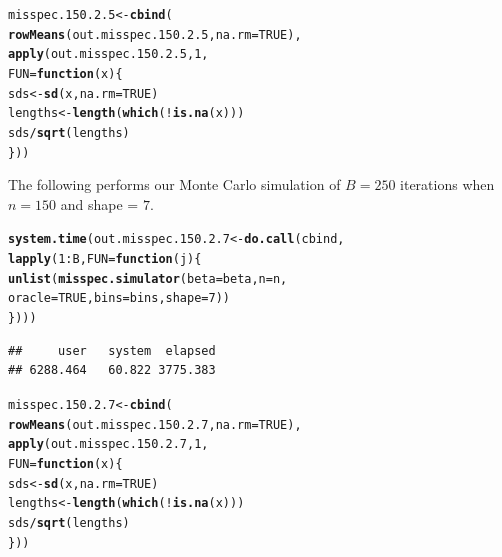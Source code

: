 \documentclass[11pt]{article}\usepackage[]{graphicx}\usepackage[]{color}
\makeatletter
\newcommand{\hlnum}[1]{\textcolor[rgb]{0.686,0.059,0.569}{#1}}%
\newcommand{\hlopt}[1]{\textcolor[rgb]{0,0,0}{#1}}%
\newcommand{\hlstd}[1]{\textcolor[rgb]{0.345,0.345,0.345}{#1}}%
\newcommand{\hlkwa}[1]{\textcolor[rgb]{0.161,0.373,0.58}{\textbf{#1}}}%
\newcommand{\hlkwb}[1]{\textcolor[rgb]{0.69,0.353,0.396}{#1}}%
\newcommand{\hlkwc}[1]{\textcolor[rgb]{0.333,0.667,0.333}{#1}}%
\newcommand{\hlkwd}[1]{\textcolor[rgb]{0.737,0.353,0.396}{\textbf{#1}}}%
\newenvironment{kframe}{%
 \def\at@end@of@kframe{}%
 \ifinner\ifhmode%
  \def\at@end@of@kframe{\end{minipage}}%
  \begin{minipage}{\columnwidth}%
 \fi\fi%
 \def\FrameCommand##1{\hskip\@totalleftmargin \hskip-\fboxsep
 \colorbox{shadecolor}{##1}\hskip-\fboxsep
     \hskip-\linewidth \hskip-\@totalleftmargin \hskip\columnwidth}%
 \MakeFramed {\advance\hsize-\width
   \@totalleftmargin\z@ \linewidth\hsize
   \@setminipage}}%
 {\par\unskip\endMakeFramed%
 \at@end@of@kframe}
\newenvironment{knitrout}{}{} %
\makeatother
\begin{document}
\begin{knitrout}
\color{fgcolor}\begin{kframe}
\begin{alltt}
\hlstd{misspec.150.2.5} \hlkwb{<-} \hlkwd{cbind}\hlstd{(}
  \hlkwd{rowMeans}\hlstd{(out.misspec.150.2.5,} \hlkwc{na.rm} \hlstd{=} \hlnum{TRUE}\hlstd{),}
  \hlkwd{apply}\hlstd{(out.misspec.150.2.5,} \hlnum{1}\hlstd{,}
  \hlkwc{FUN} \hlstd{=} \hlkwa{function}\hlstd{(}\hlkwc{x}\hlstd{)\{}
    \hlstd{sds} \hlkwb{<-} \hlkwd{sd}\hlstd{(x,} \hlkwc{na.rm} \hlstd{=} \hlnum{TRUE}\hlstd{)}
    \hlstd{lengths} \hlkwb{<-} \hlkwd{length}\hlstd{(}\hlkwd{which}\hlstd{(}\hlopt{!}\hlkwd{is.na}\hlstd{(x)))}
    \hlstd{sds} \hlopt{/} \hlkwd{sqrt}\hlstd{(lengths)}
  \hlstd{\}))}
\end{alltt}
\end{kframe}
\end{knitrout}

The following performs our Monte Carlo simulation of $B = 250$ iterations 
when $n = 150$ and shape = $7$.

\begin{knitrout}
\color{fgcolor}\begin{kframe}
\begin{alltt}
\hlkwd{system.time}\hlstd{(out.misspec.150.2.7} \hlkwb{<-} \hlkwd{do.call}\hlstd{(cbind,}
  \hlkwd{lapply}\hlstd{(}\hlnum{1}\hlopt{:}\hlstd{B,} \hlkwc{FUN} \hlstd{=} \hlkwa{function}\hlstd{(}\hlkwc{j}\hlstd{)\{}
    \hlkwd{unlist}\hlstd{(}\hlkwd{misspec.simulator}\hlstd{(}\hlkwc{beta} \hlstd{= beta,} \hlkwc{n} \hlstd{= n,}
      \hlkwc{oracle} \hlstd{=} \hlnum{TRUE}\hlstd{,} \hlkwc{bins} \hlstd{= bins,} \hlkwc{shape} \hlstd{=} \hlnum{7}\hlstd{))}
\hlstd{\})))}
\end{alltt}
\begin{verbatim}
##     user   system  elapsed 
## 6288.464   60.822 3775.383
\end{verbatim}
\end{kframe}
\end{knitrout}

\begin{knitrout}
\color{fgcolor}\begin{kframe}
\begin{alltt}
\hlstd{misspec.150.2.7} \hlkwb{<-} \hlkwd{cbind}\hlstd{(}
  \hlkwd{rowMeans}\hlstd{(out.misspec.150.2.7,} \hlkwc{na.rm} \hlstd{=} \hlnum{TRUE}\hlstd{),}
  \hlkwd{apply}\hlstd{(out.misspec.150.2.7,} \hlnum{1}\hlstd{,}
  \hlkwc{FUN} \hlstd{=} \hlkwa{function}\hlstd{(}\hlkwc{x}\hlstd{)\{}
    \hlstd{sds} \hlkwb{<-} \hlkwd{sd}\hlstd{(x,} \hlkwc{na.rm} \hlstd{=} \hlnum{TRUE}\hlstd{)}
    \hlstd{lengths} \hlkwb{<-} \hlkwd{length}\hlstd{(}\hlkwd{which}\hlstd{(}\hlopt{!}\hlkwd{is.na}\hlstd{(x)))}
    \hlstd{sds} \hlopt{/} \hlkwd{sqrt}\hlstd{(lengths)}
  \hlstd{\}))}
\end{alltt}
\end{kframe}
\end{knitrout}
\end{document}
